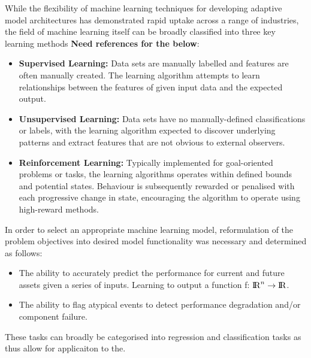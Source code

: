 \documentclass[a4paper, 10pt]{article}
\numberwithin{equation}{section}
\begin{document}
While the flexibility of machine learning techniques for developing adaptive model architectures has demonstrated rapid uptake across a range of industries, the field of machine learning itself can be broadly classified into three key learning methods \textbf{Need references for the below}:

\begin{itemize}
    \item \textbf{Supervised Learning:} Data sets are manually labelled and features are often manually created. The learning algorithm attempts to learn relationships between the features of given input data and the expected output.
    \item \textbf{Unsupervised Learning:} Data sets have no manually-defined classifications or labels, with the learning algorithm expected to discover underlying patterns and extract features that are not obvious to external observers.
    \item \textbf{Reinforcement Learning:} Typically implemented for goal-oriented problems or tasks, the learning algorithms operates within defined bounds and potential states. Behaviour is subsequently rewarded or penalised with each progressive change in state, encouraging the algorithm to operate using high-reward methods.
\end{itemize}

In order to select an appropriate machine learning model, reformulation of the problem objectives into desired model functionality was necessary and determined as follows:

\begin{itemize}
    \item The ability to accurately predict the performance for current and future assets given a series of inputs. Learning to output a function f: ${\rm I\!R}^n \rightarrow {\rm I\!R} $. 
    \item The ability to flag atypical events to detect performance degradation and/or component failure. 
\end{itemize}

These tasks can broadly be categorised into regression and classification tasks \cite{Goodfellow-et-al-2016} as thus allow for applicaiton to the. 
\end{document}
